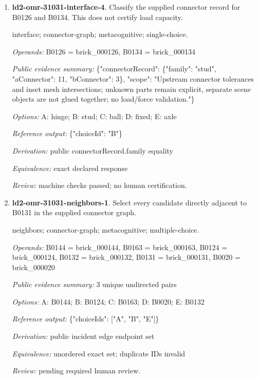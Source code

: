 \begin{enumerate}
\par{\small interface; connector-graph; metacognitive; single-choice.\par\textit{Operands:} B0015 = brick\_000015, B0016 = brick\_000016\par\textit{Public evidence summary:} \{"connectorRecord": \{"family": "hinge", "aConnector": 1, "bConnector": 2\}, "scope": "Upstream connector tolerances and inset mesh intersections; unknown parts remain explicit, separate scene objects are not glued together; no load/force validation."\}\par\textit{Options:} A: stud; B: fixed; C: axle; D: ball; E: hinge\par\textit{Reference output:} \{"choiceId": "E"\}\par\textit{Derivation:} public connectorRecord.family equality\par\textit{Equivalence:} exact declared response\par\textit{Review:} machine checks passed; no human certification.}
\item \textbf{ld2-omr-31031-interface-4}. Classify the supplied connector record for B0126 and B0134. This does not certify load capacity.
\par{\small interface; connector-graph; metacognitive; single-choice.\par\textit{Operands:} B0126 = brick\_000126, B0134 = brick\_000134\par\textit{Public evidence summary:} \{"connectorRecord": \{"family": "stud", "aConnector": 11, "bConnector": 3\}, "scope": "Upstream connector tolerances and inset mesh intersections; unknown parts remain explicit, separate scene objects are not glued together; no load/force validation."\}\par\textit{Options:} A: hinge; B: stud; C: ball; D: fixed; E: axle\par\textit{Reference output:} \{"choiceId": "B"\}\par\textit{Derivation:} public connectorRecord.family equality\par\textit{Equivalence:} exact declared response\par\textit{Review:} machine checks passed; no human certification.}
\item \textbf{ld2-omr-31031-neighbors-1}. Select every candidate directly adjacent to B0131 in the supplied connector graph.
\par{\small neighbors; connector-graph; metacognitive; multiple-choice.\par\textit{Operands:} B0144 = brick\_000144, B0163 = brick\_000163, B0124 = brick\_000124, B0132 = brick\_000132, B0131 = brick\_000131, B0020 = brick\_000020\par\textit{Public evidence summary:} 3 unique undirected pairs\par\textit{Options:} A: B0144; B: B0124; C: B0163; D: B0020; E: B0132\par\textit{Reference output:} \{"choiceIds": ["A", "B", "E"]\}\par\textit{Derivation:} public incident edge endpoint set\par\textit{Equivalence:} unordered exact set; duplicate IDs invalid\par\textit{Review:} pending required human review.}

\end{enumerate}
